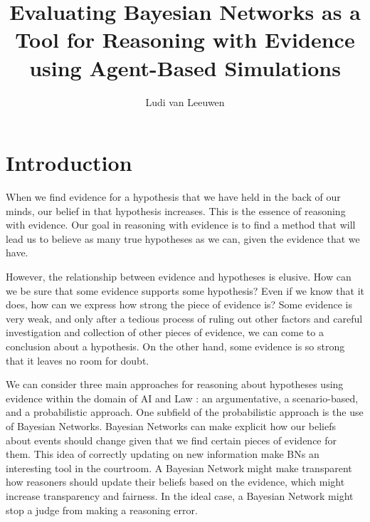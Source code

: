 \documentclass[11pt]{article}
\title{Evaluating Bayesian Networks as a Tool for Reasoning with Evidence using Agent-Based Simulations}
\author{Ludi van Leeuwen}
\date{}                                           %
\begin{document}
\maketitle
\newpage


\newpage

\tableofcontents
\newpage

\section{Introduction}
When we find evidence for a hypothesis that we have held in the back of our minds, our belief in that hypothesis increases. This is the essence of reasoning with evidence. Our goal in reasoning with evidence is to find a method that will lead us to believe as many true hypotheses as we can, given the evidence that we have.

However, the relationship between evidence and hypotheses is elusive. How can we be sure that some evidence supports some hypothesis? Even if we know that it does, how can we express how strong the piece of evidence is? Some evidence is very weak, and only after a tedious process of ruling out other factors and careful investigation and collection of other pieces of evidence, we can come to a conclusion about a hypothesis. On the other hand, some evidence is so strong that it leaves no room for doubt.

We can consider three main approaches for reasoning about hypotheses using evidence within the domain of AI and Law \citep{diBelloVerheij2018}: an argumentative, a scenario-based, and a probabilistic approach. One subfield of the probabilistic approach is the use of Bayesian Networks. Bayesian Networks can make explicit how our beliefs about events should change given that we find certain pieces of evidence for them. This idea of correctly updating on new information make BNs an interesting tool in the courtroom. A Bayesian Network might make transparent how reasoners should update their beliefs based on the evidence, which might increase transparency and fairness. In the ideal case, a Bayesian Network might stop a judge from making a reasoning error.
\end{document}
